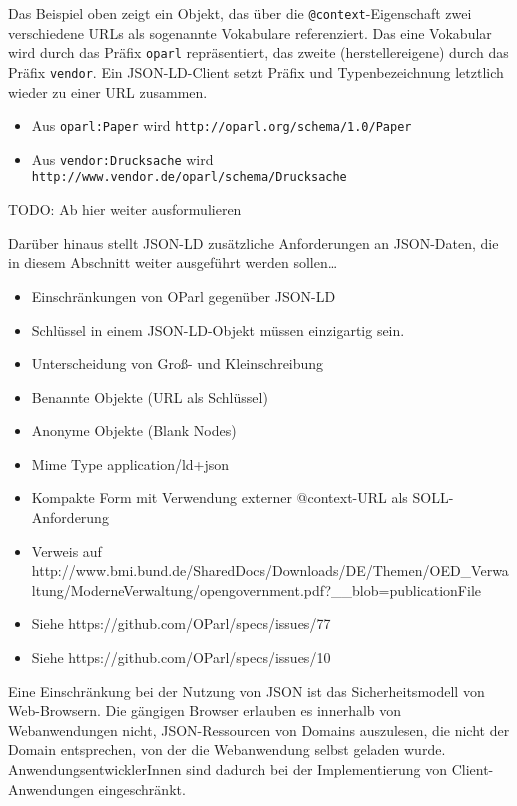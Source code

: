 \documentclass[,a4paper]{article}
\begin{document}
Das Beispiel oben zeigt ein Objekt, das über die
\texttt{@context}-Eigenschaft zwei verschiedene URLs als sogenannte
Vokabulare referenziert. Das eine Vokabular wird durch das Präfix
\texttt{oparl} repräsentiert, das zweite (herstellereigene) durch das
Präfix \texttt{vendor}. Ein JSON-LD-Client setzt Präfix und
Typenbezeichnung letztlich wieder zu einer URL zusammen.

\begin{itemize}
\itemsep1pt\parskip0pt
\item
  Aus \texttt{oparl:Paper} wird
  \texttt{http://oparl.org/schema/1.0/Paper}
\item
  Aus \texttt{vendor:Drucksache} wird
  \texttt{http://www.vendor.de/oparl/schema/Drucksache}
\end{itemize}

TODO: Ab hier weiter ausformulieren

Darüber hinaus stellt JSON-LD zusätzliche Anforderungen an JSON-Daten,
die in diesem Abschnitt weiter ausgeführt werden sollen\ldots{}

\begin{itemize}
\itemsep1pt\parskip0pt
\item
  Einschränkungen von OParl gegenüber JSON-LD
\item
  Schlüssel in einem JSON-LD-Objekt müssen einzigartig sein.
\item
  Unterscheidung von Groß- und Kleinschreibung
\item
  Benannte Objekte (URL als Schlüssel)
\item
  Anonyme Objekte (Blank Nodes)
\item
  Mime Type application/ld+json
\item
  Kompakte Form mit Verwendung externer @context-URL als
  SOLL-Anforderung
\item
  Verweis auf
  http://www.bmi.bund.de/SharedDocs/Downloads/DE/Themen/OED\_Verwaltung/ModerneVerwaltung/opengovernment.pdf?\_\_blob=publicationFile
\item
  Siehe https://github.com/OParl/specs/issues/77
\item
  Siehe https://github.com/OParl/specs/issues/10
\end{itemize}


Eine Einschränkung bei der Nutzung von JSON ist das Sicherheitsmodell
von Web-Browsern. Die gängigen Browser erlauben es innerhalb von
Webanwendungen nicht, JSON-Ressourcen von Domains auszulesen, die nicht
der Domain entsprechen, von der die Webanwendung selbst geladen wurde.
AnwendungsentwicklerInnen sind dadurch bei der Implementierung von
Client-Anwendungen eingeschränkt.
\end{document}
